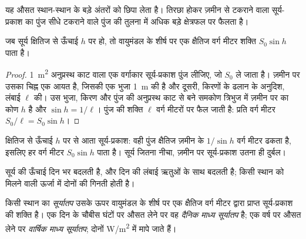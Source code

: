 यह औसत स्थान-स्थान के बड़े अंतरों को छिपा लेता है। तिरछा होकर ज़मीन से टकराने वाला
सूर्य-प्रकाश का पुंज सीधे टकराने वाले पुंज की तुलना में अधिक बड़े क्षेत्रफल पर फैलता है।

\begin{proposition}[क्षैतिज सतह पर सूर्य-प्रकाश]\label{prop:g10:earth-energy-budget:height}
जब सूर्य क्षितिज से ऊँचाई $h$ पर हो, तो वायुमंडल के शीर्ष पर एक क्षैतिज वर्ग मीटर
शक्ति $S_0 \sin h$ पाता है।
\end{proposition}

\begin{proof}
\qty{1}{m^2} अनुप्रस्थ काट वाला एक वर्गाकार सूर्य-प्रकाश पुंज लीजिए, जो
$S_0$ ले जाता है। ज़मीन पर उसका चिह्न एक आयत है, जिसकी एक भुजा \qty{1}{m} की है
और दूसरी, किरणों के ढलान के अनुदिश, लंबाई $\ell$ की। उस भुजा, किरण और पुंज की
अनुप्रस्थ काट से बने समकोण त्रिभुज में ज़मीन पर का कोण $h$ है और $\sin h = 1/\ell$।
पुंज की शक्ति $\ell$ वर्ग मीटरों पर फैल जाती है: प्रति वर्ग
मीटर $S_0/\ell = S_0 \sin h$।
\end{proof}

\begin{omfigure}

{\small क्षितिज से ऊँचाई $h$ पर से आता सूर्य-प्रकाश: वही पुंज
क्षैतिज ज़मीन के $1/\sin h$ वर्ग मीटर ढकता है, इसलिए हर वर्ग मीटर
$S_0 \sin h$ पाता है। सूर्य जितना नीचा, ज़मीन पर सूर्य-प्रकाश उतना ही
दुर्बल।}
\end{omfigure}

सूर्य की ऊँचाई दिन भर बदलती है, और दिन की लंबाई ऋतुओं के साथ बदलती है; किसी स्थान को
मिलने वाली ऊर्जा में दोनों की गिनती होती है।

\begin{definition}[सूर्यातप]\label{def:g10:earth-energy-budget:insolation}
किसी स्थान का \emph{सूर्यातप} उसके ऊपर वायुमंडल के शीर्ष पर एक
क्षैतिज वर्ग मीटर द्वारा प्राप्त सूर्य-प्रकाश की शक्ति है। एक दिन के चौबीस घंटों पर औसत
लेने पर वह \emph{दैनिक माध्य
सूर्यातप} है; एक वर्ष पर औसत लेने पर \emph{वार्षिक माध्य सूर्यातप}; दोनों
\unit{W/m^2} में मापे जाते हैं।
\end{definition}

